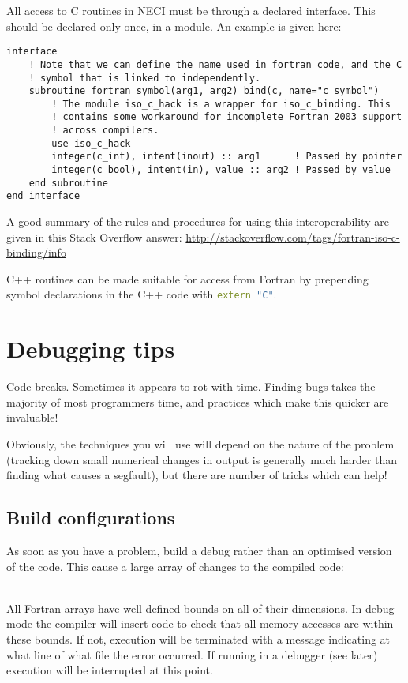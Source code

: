 \documentclass[a4paper,notitlepage,dvipsnames]{scrreprt}
\newcommand\headitem[1]{\needspace{1.5\baselineskip}\item[{\boldmath #1 \nopagebreak}] \hfill \\ \nopagebreak}
\let\code\lstinline
\begin{document}
{{{All access to C routines in NECI must be through a declared interface. This
should be declared only once, in a module. An example is given here:
\begin{lstlisting}
interface
	! Note that we can define the name used in fortran code, and the C
	! symbol that is linked to independently.
	subroutine fortran_symbol(arg1, arg2) bind(c, name="c_symbol")
		! The module iso_c_hack is a wrapper for iso_c_binding. This
		! contains some workaround for incomplete Fortran 2003 support
		! across compilers.
		use iso_c_hack
		integer(c_int), intent(inout) :: arg1      ! Passed by pointer
		integer(c_bool), intent(in), value :: arg2 ! Passed by value
	end subroutine
end interface
\end{lstlisting}
A good summary of the rules and procedures for using this interoperability are
given in this Stack Overflow answer:
\url{http://stackoverflow.com/tags/fortran-iso-c-binding/info}

C++ routines can be made suitable for access from Fortran by prepending symbol
declarations in the C++ code with \code[language=C++]{extern "C"}.

\section{Debugging tips}
Code breaks. Sometimes it appears to rot with time. Finding bugs takes the
majority of most programmers time, and practices which make this quicker are
invaluable!

Obviously, the techniques you will use will depend on the nature of the
problem (tracking down small numerical changes in output is generally much
harder than finding what causes a segfault), but there are number of tricks
which can help!

\subsection{Build configurations}
As soon as you have a problem, build a debug rather than an optimised version
of the code. This cause a large array of changes to the compiled code:
\begin{description}
	\headitem{Array bounds checking}
		All Fortran arrays have well defined bounds on all of their dimensions.
		In debug mode the compiler will insert code to check that all memory
		accesses are within these bounds. If not, execution will be terminated
		with a message indicating at what line of what file the error occurred.
		If running in a debugger (see later) execution will be interrupted at
		this point.


\end{description}}}}
\end{document}
